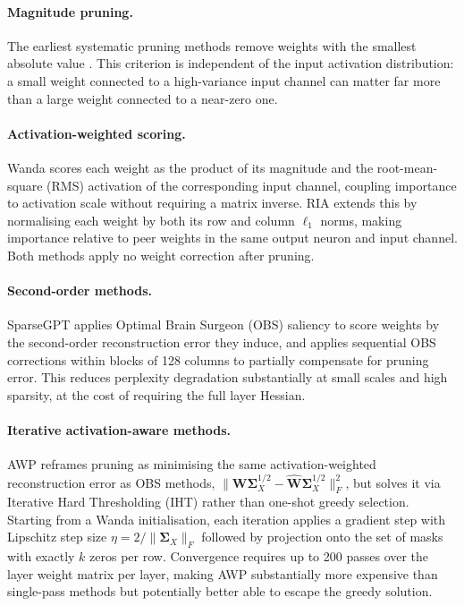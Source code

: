 \documentclass{article}
\begin{document}
\paragraph{Magnitude pruning.}
The earliest systematic pruning methods remove weights with the smallest
absolute value \citep{han2015learning}. This criterion is independent of the
input activation distribution: a small weight connected to a high-variance
input channel can matter far more than a large weight connected to a
near-zero one.

\paragraph{Activation-weighted scoring.}
Wanda \citep{sun2023simple} scores each weight as the product of its magnitude
and the root-mean-square (RMS) activation of the corresponding input channel,
coupling importance to activation scale without requiring a matrix inverse.
RIA \citep{zhang2024plug} extends this by normalising each weight by both its
row and column $\ell_1$ norms, making importance relative to peer weights in
the same output neuron and input channel. Both methods apply no weight
correction after pruning.

\paragraph{Second-order methods.}
SparseGPT \citep{frantar2023sparsegpt} applies Optimal Brain Surgeon (OBS)
saliency \citep{hassibi1993optimal,lecun1989optimal} to score weights by the
second-order reconstruction error they induce, and applies sequential OBS
corrections within blocks of 128 columns to partially compensate for pruning
error. This reduces perplexity degradation substantially at small scales and
high sparsity, at the cost of requiring the full layer Hessian.

\paragraph{Iterative activation-aware methods.}
AWP \citep{liu2025awp} reframes pruning as minimising the same activation-weighted
reconstruction error as OBS methods,
$\|\mathbf{W}\boldsymbol{\Sigma}_X^{1/2} - \hat{\mathbf{W}}\boldsymbol{\Sigma}_X^{1/2}\|_F^2$,
but solves it via Iterative Hard Thresholding (IHT) rather than one-shot greedy
selection. Starting from a Wanda initialisation, each iteration applies a gradient
step with Lipschitz step size $\eta = 2/\|\boldsymbol{\Sigma}_X\|_F$ followed by
projection onto the set of masks with exactly $k$ zeros per row. Convergence
requires up to 200 passes over the layer weight matrix per layer, making AWP
substantially more expensive than single-pass methods but potentially better able to
escape the greedy solution.
\end{document}
